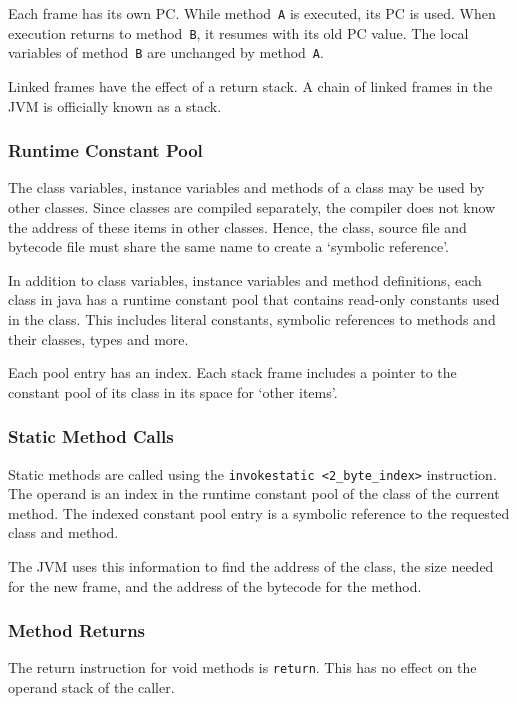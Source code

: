 Each frame has its own PC.
While method~\texttt{A} is executed, its PC is used.
When execution returns to method~\texttt{B}, it resumes with its old PC value.
The local variables of method~\texttt{B} are unchanged by method~\texttt{A}.

Linked frames have the effect of a return stack.
A chain of linked frames in the JVM is officially known as a stack.

\subsubsection{Runtime Constant Pool}

The class variables, instance variables and methods of a class may be used by other classes.
Since classes are compiled separately, the compiler does not know the address of these items in other classes.
Hence, the class, source file and bytecode file must share the same name to create a `symbolic reference'.

In addition to class variables, instance variables and method definitions, each class in java has a runtime constant pool that contains read-only constants used in the class.
This includes literal constants, symbolic references to methods and their classes, types and more.

Each pool entry has an index.
Each stack frame includes a pointer to the constant pool of its class in its space for `other items'.

\subsubsection{Static Method Calls}

Static methods are called using the \texttt{invokestatic <2\_byte\_index>} instruction.
The operand is an index in the runtime constant pool of the class of the current method.
The indexed constant pool entry is a symbolic reference to the requested class and method.

The JVM uses this information to find the address of the class, the size needed for the new frame, and the address of the bytecode for the method.

\subsubsection{Method Returns}

The return instruction for void methods is \texttt{return}.
This has no effect on the operand stack of the caller.

